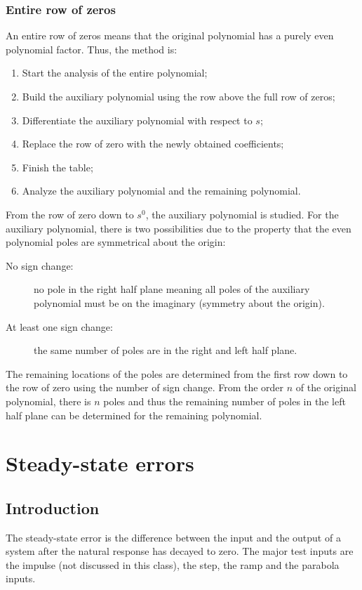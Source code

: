\documentclass[10pt, twocolumn]{article}
\begin{document}
\subsubsection{Entire row of zeros}
An entire row of zeros means that the original polynomial has a purely even polynomial factor.
Thus, the method is:
\begin{enumerate}
  \item Start the analysis of the entire polynomial;
  \item Build the auxiliary polynomial using the row above the full row of zeros;
  \item Differentiate the auxiliary polynomial with respect to \(s\);
  \item Replace the row of zero with the newly obtained coefficients;
  \item Finish the table;
  \item Analyze the auxiliary polynomial and the remaining polynomial.
\end{enumerate}

From the row of zero down to \(s^0\), the auxiliary polynomial is studied.
For the auxiliary polynomial, there is two possibilities due to the property that the even polynomial poles are symmetrical about the origin:
\begin{description}
  \item[No sign change:] no pole in the right half plane meaning all poles of the auxiliary polynomial must be on the imaginary (symmetry about the origin).
  \item[At least one sign change:] the same number of poles are in the right and left half plane.
\end{description}

The remaining locations of the poles are determined from the first row down to the row of zero using the number of sign change.
From the order \(n\) of the original polynomial, there is \(n\) poles and thus the remaining number of poles in the left half plane can be determined for the remaining polynomial.


\section{Steady-state errors}
\subsection{Introduction}
The steady-state error is the difference between the input and the output of a system after the natural response has decayed to zero.
The major test inputs are the impulse (not discussed in this class), the step, the ramp and the parabola inputs.
\end{document}

